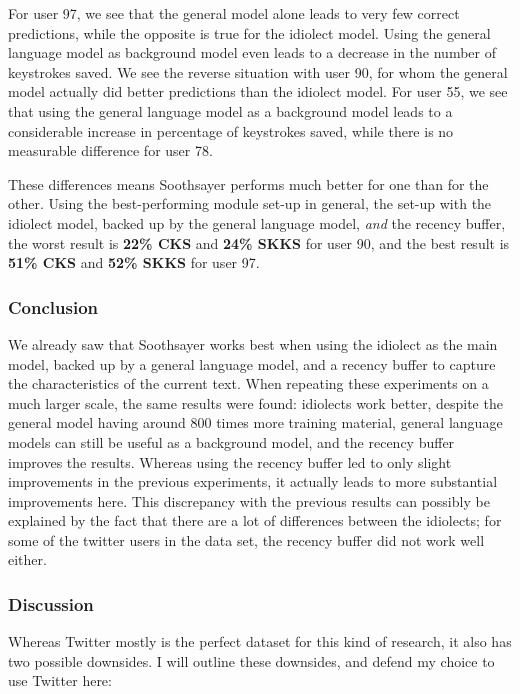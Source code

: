 \documentclass[12pt]{article}
\begin{document}
For user 97, we see that the general model alone leads to very few correct predictions, while the opposite is true for the idiolect model. Using the general language model as background model even leads to a decrease in the number of keystrokes saved. We see the reverse situation with user 90, for whom the general model actually did better predictions than the idiolect model. For user 55, we see that using the general language model as a background model leads to a considerable increase in percentage of keystrokes saved, while there is no measurable difference for user 78.

These differences means Soothsayer performs much better for one than for the other. Using the best-performing module set-up in general, the set-up with the idiolect model, backed up by the general language model, \emph{and} the recency buffer, the worst result is \textbf{22\% CKS} and \textbf{24\% SKKS} for user 90, and the best result is \textbf{51\% CKS} and \textbf{52\% SKKS} for user 97.


\subsubsection{Conclusion}
We already saw that Soothsayer works best when using the idiolect as the main model, backed up by a general language model, and a recency buffer to capture the characteristics of the current text. When repeating these experiments on a much larger scale, the same results were found: idiolects work better, despite the general model having around 800 times more training material, general language models can still be useful as a background model, and the recency buffer improves the results. Whereas using the recency buffer led to only slight improvements in the previous experiments, it actually leads to more substantial improvements here. This discrepancy with the previous results can possibly be explained by the fact that there are a lot of differences between the idiolects; for some of the twitter users in the data set, the recency buffer did not work well either.

\subsubsection{Discussion}
Whereas Twitter mostly is the perfect dataset for this kind of research, it also has two possible downsides. I will outline these downsides, and defend my choice to use Twitter here:
\end{document}
